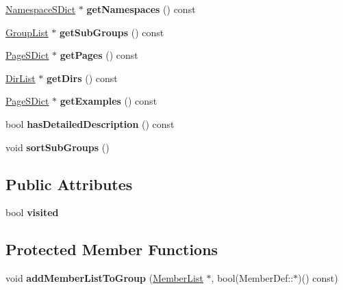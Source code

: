 \begin{DoxyCompactItemize}
\mbox{\label{class_group_def_a552b6af7d888336745407a8a450dd21d}} 
\mbox{\hyperlink{class_namespace_s_dict}{Namespace\+S\+Dict}} $\ast$ {\bfseries get\+Namespaces} () const
\item 
\mbox{\label{class_group_def_a095bff08155484645c319a8c82d7707e}} 
\mbox{\hyperlink{class_group_list}{Group\+List}} $\ast$ {\bfseries get\+Sub\+Groups} () const
\item 
\mbox{\label{class_group_def_afd087cad1730acf904a43d805e94f366}} 
\mbox{\hyperlink{class_page_s_dict}{Page\+S\+Dict}} $\ast$ {\bfseries get\+Pages} () const
\item 
\mbox{\label{class_group_def_ad84893687f6f7fda9a678186adc4f293}} 
\mbox{\hyperlink{class_dir_list}{Dir\+List}} $\ast$ {\bfseries get\+Dirs} () const
\item 
\mbox{\label{class_group_def_ad69a336f4534496fb23ae62ec5936de2}} 
\mbox{\hyperlink{class_page_s_dict}{Page\+S\+Dict}} $\ast$ {\bfseries get\+Examples} () const
\item 
\mbox{\label{class_group_def_af77c291c8ae7b439ea0c6a88c99e2c32}} 
bool {\bfseries has\+Detailed\+Description} () const
\item 
\mbox{\label{class_group_def_a4df309532742545e812bedd9e1656712}} 
void {\bfseries sort\+Sub\+Groups} ()
\end{DoxyCompactItemize}
\subsection*{Public Attributes}
\begin{DoxyCompactItemize}
\item 
\mbox{\label{class_group_def_aea366de5d581d83de1217487b598b66b}} 
bool {\bfseries visited}
\end{DoxyCompactItemize}
\subsection*{Protected Member Functions}
\begin{DoxyCompactItemize}
\item 
\mbox{\label{class_group_def_aa5358a8ca2d0a45c201e91be5647538e}} 
void {\bfseries add\+Member\+List\+To\+Group} (\mbox{\hyperlink{class_member_list}{Member\+List}} $\ast$, bool(Member\+Def\+::$\ast$)() const)
\end{DoxyCompactItemize}
